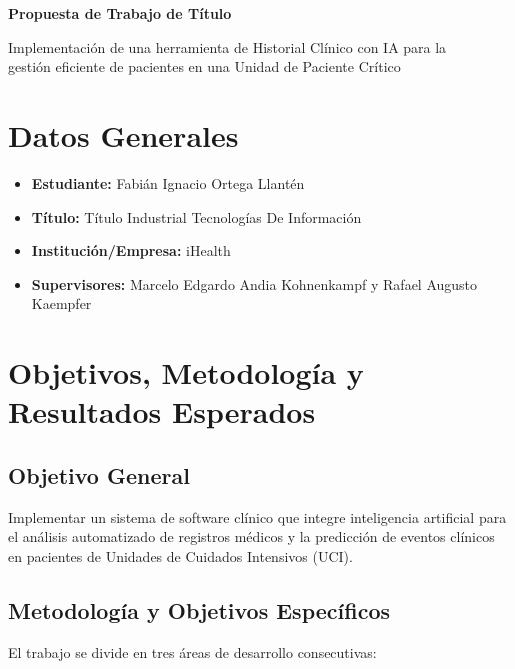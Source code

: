 \documentclass[11pt,a4paper]{article}
\begin{document}
\thispagestyle{fancy}

\vspace*{0.3cm}

{\color{ihealthnavy}\LARGE\bfseries Propuesta de Trabajo de Título}

\smallskip
{\color{ihealthnavy}\large
    Implementación de una herramienta de Historial Clínico con IA para la\\
    gestión eficiente de pacientes en una Unidad de Paciente Crítico
}

\vspace{0.4cm}
\noindent{\color{ihealthgreen}\rule{\textwidth}{2pt}}
\vspace{0.5cm}

\section*{Datos Generales}
\begin{itemize}
    \item \textbf{Estudiante:} Fabián Ignacio Ortega Llantén
    \item \textbf{Título:} Título Industrial Tecnologías De Información
    \item \textbf{Institución/Empresa:} iHealth
    \item \textbf{Supervisores:} Marcelo Edgardo Andia Kohnenkampf y Rafael Augusto Kaempfer
\end{itemize}

\vspace{0.5cm}

\section*{Objetivos, Metodología y Resultados Esperados}

\subsection*{Objetivo General}
Implementar un sistema de software clínico que integre inteligencia artificial para el análisis
automatizado de registros médicos y la predicción de eventos clínicos en pacientes de Unidades
de Cuidados Intensivos (UCI).

\subsection*{Metodología y Objetivos Específicos}
El trabajo se divide en tres áreas de desarrollo consecutivas:
\end{document}
